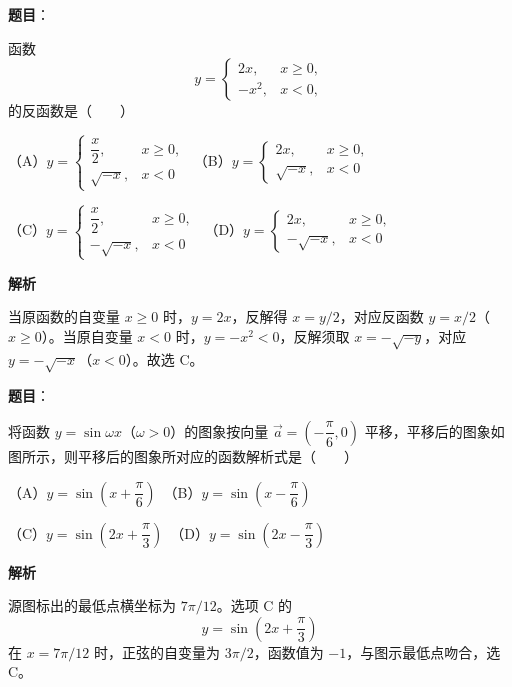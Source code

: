 \begin{answer}

\textbf{题目}：

函数
\nopagebreak[4]
\[
y=\begin{cases}
2x,&x\geqslant0,\\
-x^2,&x<0,
\end{cases}
\]
的反函数是\mbox{（　　）}

（A）$y=\begin{cases}\dfrac{x}{2},&x\geqslant0,\\\sqrt{-x},&x<0\end{cases}$　（B）$y=\begin{cases}2x,&x\geqslant0,\\\sqrt{-x},&x<0\end{cases}$

（C）$y=\begin{cases}\dfrac{x}{2},&x\geqslant0,\\-\sqrt{-x},&x<0\end{cases}$　（D）$y=\begin{cases}2x,&x\geqslant0,\\-\sqrt{-x},&x<0\end{cases}$

\textbf{解析}

当原函数的自变量 $x\ge0$ 时，$y=2x$，反解得 $x=y/2$，对应反函数 $y=x/2$（$x\ge0$）。当原自变量 $x<0$ 时，$y=-x^2<0$，反解须取 $x=-\sqrt{-y}$，对应 $y=-\sqrt{-x}$（$x<0$）。故选 C。


\end{answer}
\begin{answer}

\textbf{题目}：

将函数 $y=\sin\omega x$（$\omega>0$）的图象按向量 $\vec a=\left(-\dfrac{\pi}{6},0\right)$ 平移，平移后的图象如图所示，则平移后的图象所对应的函数解析式是\mbox{（　　）}
\nopagebreak[4]
\begin{center}\end{center}
\nopagebreak[4]
（A）$y=\sin\left(x+\dfrac{\pi}{6}\right)$　（B）$y=\sin\left(x-\dfrac{\pi}{6}\right)$

（C）$y=\sin\left(2x+\dfrac{\pi}{3}\right)$　（D）$y=\sin\left(2x-\dfrac{\pi}{3}\right)$

\textbf{解析}

源图标出的最低点横坐标为 $7\pi/12$。选项 C 的
\nopagebreak[4]
\[
y=\sin\left(2x+\frac\pi3\right)
\]
在 $x=7\pi/12$ 时，正弦的自变量为 $3\pi/2$，函数值为 $-1$，与图示最低点吻合，选 C。


\end{answer}
